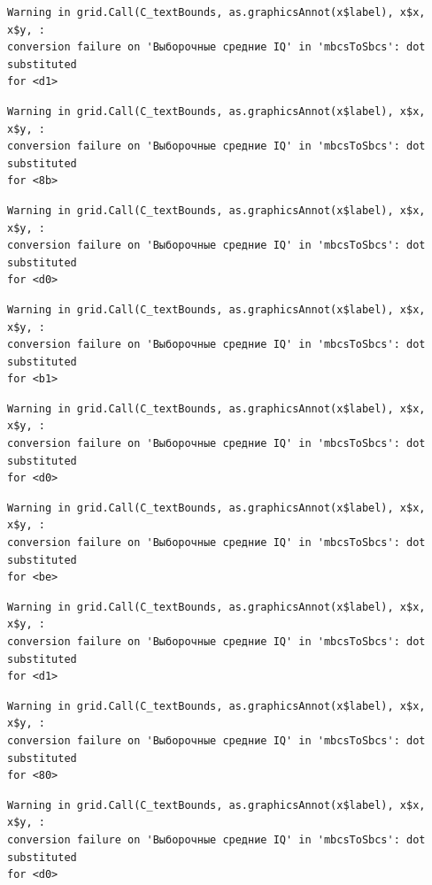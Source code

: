 \documentclass[
  letterpaper,
]{scrbook}
\theoremstyle{definition}
\theoremstyle{remark}
\begin{document}
\begin{verbatim}
Warning in grid.Call(C_textBounds, as.graphicsAnnot(x$label), x$x, x$y, :
conversion failure on 'Выборочные средние IQ' in 'mbcsToSbcs': dot substituted
for <d1>
\end{verbatim}

\begin{verbatim}
Warning in grid.Call(C_textBounds, as.graphicsAnnot(x$label), x$x, x$y, :
conversion failure on 'Выборочные средние IQ' in 'mbcsToSbcs': dot substituted
for <8b>
\end{verbatim}

\begin{verbatim}
Warning in grid.Call(C_textBounds, as.graphicsAnnot(x$label), x$x, x$y, :
conversion failure on 'Выборочные средние IQ' in 'mbcsToSbcs': dot substituted
for <d0>
\end{verbatim}

\begin{verbatim}
Warning in grid.Call(C_textBounds, as.graphicsAnnot(x$label), x$x, x$y, :
conversion failure on 'Выборочные средние IQ' in 'mbcsToSbcs': dot substituted
for <b1>
\end{verbatim}

\begin{verbatim}
Warning in grid.Call(C_textBounds, as.graphicsAnnot(x$label), x$x, x$y, :
conversion failure on 'Выборочные средние IQ' in 'mbcsToSbcs': dot substituted
for <d0>
\end{verbatim}

\begin{verbatim}
Warning in grid.Call(C_textBounds, as.graphicsAnnot(x$label), x$x, x$y, :
conversion failure on 'Выборочные средние IQ' in 'mbcsToSbcs': dot substituted
for <be>
\end{verbatim}

\begin{verbatim}
Warning in grid.Call(C_textBounds, as.graphicsAnnot(x$label), x$x, x$y, :
conversion failure on 'Выборочные средние IQ' in 'mbcsToSbcs': dot substituted
for <d1>
\end{verbatim}

\begin{verbatim}
Warning in grid.Call(C_textBounds, as.graphicsAnnot(x$label), x$x, x$y, :
conversion failure on 'Выборочные средние IQ' in 'mbcsToSbcs': dot substituted
for <80>
\end{verbatim}

\begin{verbatim}
Warning in grid.Call(C_textBounds, as.graphicsAnnot(x$label), x$x, x$y, :
conversion failure on 'Выборочные средние IQ' in 'mbcsToSbcs': dot substituted
for <d0>
\end{verbatim}
\end{document}
